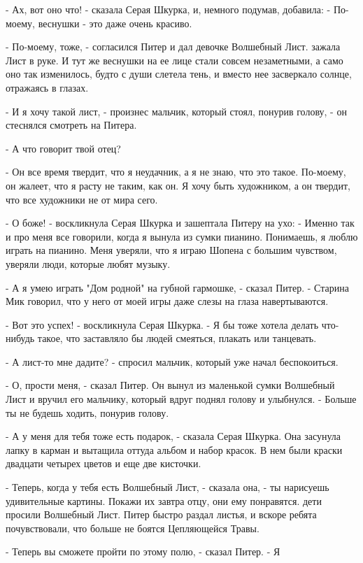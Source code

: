 \par- Ах, вот оно что! - сказала Серая Шкурка, и, немного подумав, 
добавила: - По-моему, веснушки - это даже очень красиво.
\par- По-моему, тоже, - согласился Питер и дал девочке Волшебный Лист.
 зажала Лист в руке. И тут же веснушки на ее лице стали совсем 
незаметными, а само оно так изменилось, будто с души слетела тень, и 
вместо нее засверкало солнце, отражаясь в глазах.
\par- И я хочу такой лист, - произнес мальчик, который стоял, понурив 
голову, - он стеснялся смотреть на Питера.
\par- А что говорит твой отец?
\par- Он все время твердит, что я неудачник, а я не знаю, что это 
такое. По-моему, он жалеет, что я расту не таким, как он. Я хочу быть 
художником, а он твердит, что все художники не от мира сего.
\par- О боже! - воскликнула Серая Шкурка и зашептала Питеру на ухо: - 
Именно так и про меня все говорили, когда я вынула из сумки пианино. 
Понимаешь, я люблю играть на пианино. Меня уверяли, что я играю Шопена 
с большим чувством, уверяли люди, которые любят музыку.
\par- А я умею играть "Дом родной" на губной гармошке, - сказал Питер. 
- Старина Мик говорил, что у него от моей игры даже слезы на глаза 
навертываются.
\par- Вот это успех! - воскликнула Серая Шкурка. - Я бы тоже хотела 
делать что-нибудь такое, что заставляло бы людей смеяться, плакать или 
танцевать.
\par- А лист-то мне дадите? - спросил мальчик, который уже начал 
беспокоиться.
\par- О, прости меня, - сказал Питер. Он вынул из маленькой сумки 
Волшебный Лист и вручил его мальчику, который вдруг поднял голову и 
улыбнулся. - Больше ты не будешь ходить, понурив голову.
\par- А у меня для тебя тоже есть подарок, - сказала Серая Шкурка. Она 
засунула лапку в карман и вытащила оттуда альбом и набор красок. В нем 
были краски двадцати четырех цветов и еще две кисточки.
\par- Теперь, когда у тебя есть Волшебный Лист, - сказала она, - ты 
нарисуешь удивительные картины. Покажи их завтра отцу, они ему 
понравятся.
 дети просили Волшебный Лист. Питер быстро раздал листья, и 
вскоре ребята почувствовали, что больше не боятся Цепляющейся Травы.
\par- Теперь вы сможете пройти по этому полю, - сказал Питер. - Я 
